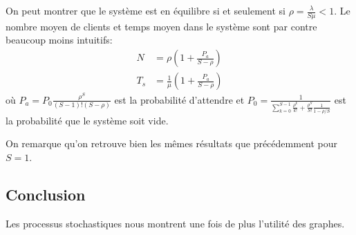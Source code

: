     On peut montrer que le système est en équilibre si et seulement si
    $\rho = \frac \lambda {S\mu} < 1$. Le nombre moyen de clients et temps
    moyen dans le système sont par contre beaucoup moins intuitifs:
    \[
      \begin{aligned}
        N   &= \rho \left(1 + \frac{P_a}{S-\rho}\right) \\
        T_s &= \frac{1}{\mu} \left(1 + \frac{P_a}{S-\rho}\right)
      \end{aligned}
    \]
    où $\displaystyle P_a = P_0 \frac{\rho^S}{(S-1)!(S-\rho)}$ est la
    probabilité d'attendre et $\displaystyle P_0 = \frac{1}{\sum_{k=0}^{S-1}
    \frac{\rho^k}{k!} + \frac {\rho^S}{S!} \frac {1}{1-\rho/S} }$ est la
    probabilité que le système soit vide.

    On remarque qu'on retrouve bien les mêmes résultats que précédemment pour
    $S=1$.

\subsection{Conclusion}
  Les processus stochastiques nous montrent une fois de plus l'utilité des
  graphes. %

